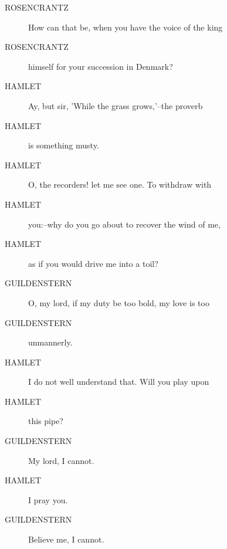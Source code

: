 \documentclass{article}
\begin{document}
\begin{description}
            
\item[ROSENCRANTZ] How can that be, when you have the voice of the king
\item[ROSENCRANTZ] himself for your succession in Denmark?
\end{description}
          
\begin{description}
            
\item[HAMLET] Ay, but sir, 'While the grass grows,'--the proverb
\item[HAMLET] is something musty.
\item[HAMLET] O, the recorders! let me see one. To withdraw with
\item[HAMLET] you:--why do you go about to recover the wind of me,
\item[HAMLET] as if you would drive me into a toil?
\end{description}
          
\begin{description}
            
\item[GUILDENSTERN] O, my lord, if my duty be too bold, my love is too
\item[GUILDENSTERN] unmannerly.
\end{description}
          
\begin{description}
            
\item[HAMLET] I do not well understand that. Will you play upon
\item[HAMLET] this pipe?
\end{description}
          
\begin{description}
            
\item[GUILDENSTERN] My lord, I cannot.
\end{description}
          
\begin{description}
            
\item[HAMLET] I pray you.
\end{description}
          
\begin{description}
            
\item[GUILDENSTERN] Believe me, I cannot.
\end{description}
          
\end{document}
